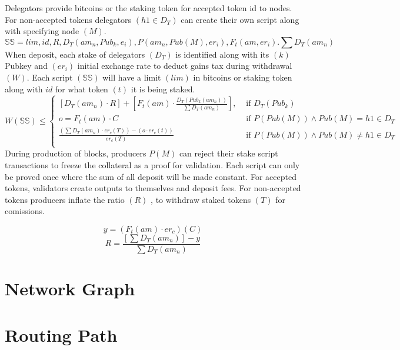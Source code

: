 \documentclass[a4paper,10pt]{article}
\begin{document}
Delegators provide bitcoins or the staking token for accepted token id to nodes. For non-accepted tokens delegators $(h1 \in D_T)$ can create their own script along with specifying node $(M)$.
\begin{equation*}
\mathbb{SS} = lim,id,R,D_T(am_n,Pub_k,e_i), P(am_n,Pub(M),er_i),F_t(am,er_i). \sum D_T(am_n)
\end{equation*}
When deposit, each stake of delegators $(D_T)$ is identified along with its $(k)$ Pubkey and $(er_i)$ initial exchange rate to deduct gains tax during withdrawal $(W)$. Each script $(\mathbb{SS})$ will have a limit $(lim)$ in bitcoins or staking token along with $id$ for what token $(t)$ it is being staked.
\begin{equation*}
W(\mathbb{SS}) \leq
\begin{cases} 
[D_T(am_n) \cdot R] + [F_t(am) \cdot \frac{D_T(Pub_k(am_n))}{\sum D_T(am_n)}]  , & \text{ if } D_T(Pub_k) \\
o=F_t(am) \cdot C & \text{ if } P(Pub(M)) \wedge Pub(M)= h1 \in D_T\\
\frac{(\sum D_T(am_n) \cdot er_c(T))-(o \cdot er_c(t))}{er_c(T)}  & \text{ if } P(Pub(M)) \wedge Pub(M)\neq h1 \in D_T\\
\end{cases}
\end{equation*}
During production of blocks, producers $P(M)$ can reject their stake script transactions to freeze the collateral as a proof for validation. Each script can only be proved once where the sum of all deposit will be made constant. For accepted tokens, validators create outputs to themselves and deposit fees. For non-accepted tokens producers inflate the ratio $(R)$ , to withdraw staked tokens $(T)$ for comissions.

\begin{equation*}
y=(F_t(am) \cdot er_c)(C)
\end{equation*}
\begin{equation*}
R=\frac{[\sum D_T(am_n)]-y}{\sum D_T(am_n)}
\end{equation*}

\section{Network Graph}

\section{Routing Path}
\end{document}
